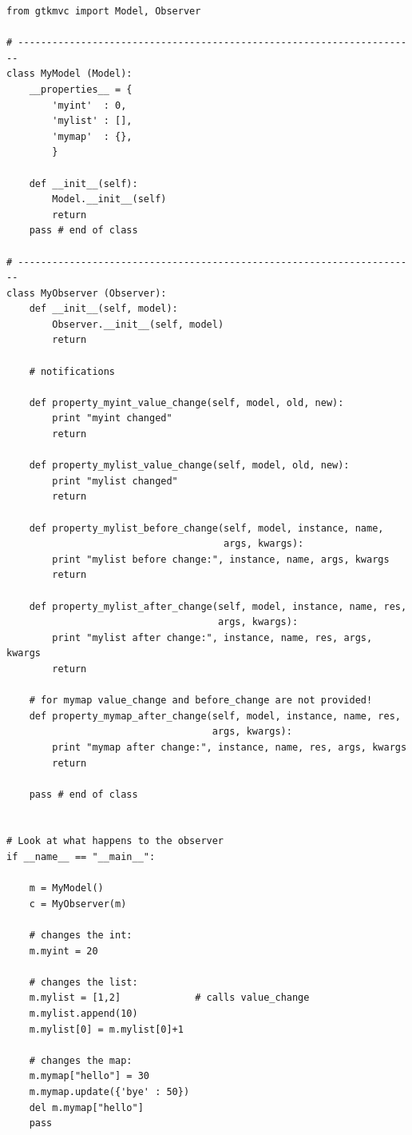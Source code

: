 { \codesize 
\begin{verbatim} 
from gtkmvc import Model, Observer

# ----------------------------------------------------------------------
class MyModel (Model):    
    __properties__ = {
        'myint'  : 0, 
        'mylist' : [],
        'mymap'  : {},
        }

    def __init__(self):
        Model.__init__(self)
        return    
    pass # end of class

# ----------------------------------------------------------------------
class MyObserver (Observer):
    def __init__(self, model):
        Observer.__init__(self, model)
        return

    # notifications

    def property_myint_value_change(self, model, old, new):
        print "myint changed"
        return

    def property_mylist_value_change(self, model, old, new):
        print "mylist changed"
        return

    def property_mylist_before_change(self, model, instance, name,
                                      args, kwargs):
        print "mylist before change:", instance, name, args, kwargs
        return

    def property_mylist_after_change(self, model, instance, name, res,
                                     args, kwargs):
        print "mylist after change:", instance, name, res, args, kwargs
        return

    # for mymap value_change and before_change are not provided!
    def property_mymap_after_change(self, model, instance, name, res,
                                    args, kwargs):
        print "mymap after change:", instance, name, res, args, kwargs
        return

    pass # end of class


# Look at what happens to the observer
if __name__ == "__main__":

    m = MyModel()
    c = MyObserver(m)

    # changes the int:
    m.myint = 20

    # changes the list:
    m.mylist = [1,2]             # calls value_change
    m.mylist.append(10)     
    m.mylist[0] = m.mylist[0]+1

    # changes the map:
    m.mymap["hello"] = 30
    m.mymap.update({'bye' : 50})
    del m.mymap["hello"]
    pass
\end{verbatim}
}

